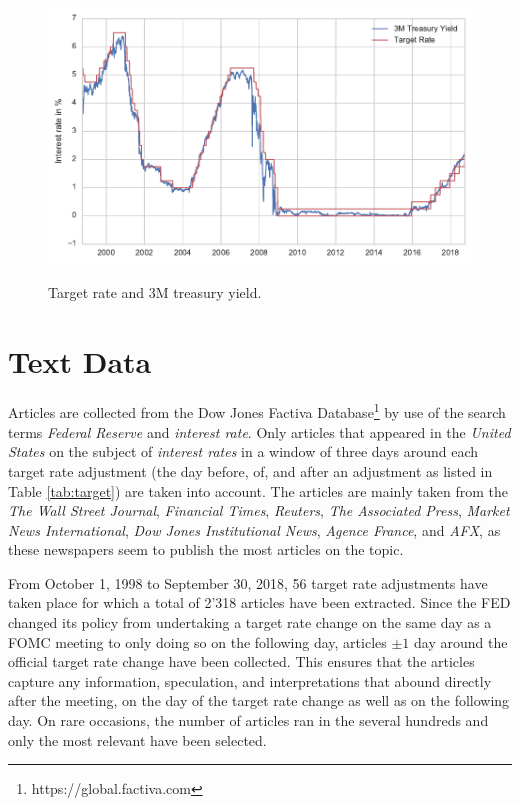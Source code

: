 \documentclass[11pt,a4paper,english,oneside]{book}
\numberwithin{equation}{chapter}
\begin{document}
\begin{figure}
	\caption{Target rate and 3M treasury yield.}
	\centering
	\includegraphics[scale=1]{Images/3Mtreasury.pdf}
	\label{3Mtreasury}
\end{figure}

\section{Text Data}\label{textdata}

Articles are collected from the Dow Jones Factiva Database\footnote{https://global.factiva.com} by use of the search terms \textit{Federal Reserve} and \textit{interest rate}. Only articles that appeared in the \textit{United States} on the subject of \textit{interest rates} in a window of three days around each target rate adjustment (the day before, of, and after an adjustment as listed in Table \ref{tab:target}) are taken into account. The articles are mainly taken from the \textit{The Wall Street Journal}, \textit{Financial Times}, \textit{Reuters}, \textit{The Associated Press}, \textit{Market News International}, \textit{Dow Jones Institutional News}, \textit{Agence France}, and \textit{AFX}, as these newspapers seem to publish the most articles on the topic. 

From October 1, 1998 to September 30, 2018, 56 target rate adjustments have taken place for which a total of 2'318 articles have been extracted. Since the FED changed its policy from undertaking a target rate change on the same day as a FOMC meeting to only doing so on the following day, articles $\pm1$ day around the official target rate change have been collected. This ensures that the articles capture any information, speculation, and interpretations that abound directly after the meeting, on the day of the target rate change as well as on the following day. On rare occasions, the number of articles ran in the several hundreds and only the most relevant have been selected. 
\end{document}
